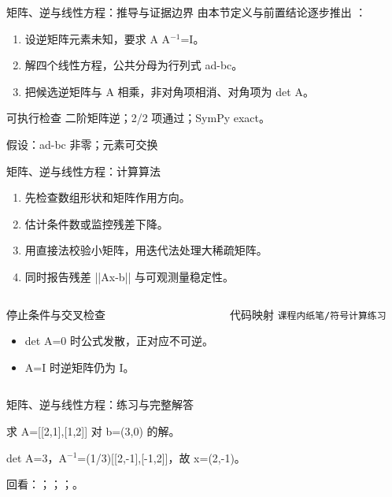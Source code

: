 \begin{frame}[t]{矩阵、逆与线性方程：推导与证据边界}
\footnotesize
{}\quad 由本节定义与前置结论逐步推出 ：
\begin{enumerate}
\item 设逆矩阵元素未知，要求 A A\ensuremath{^{-1}}=I。
\item 解四个线性方程，公共分母为行列式 ad-bc。
\item 把候选逆矩阵与 A 相乘，非对角项相消、对角项为 det A。
\end{enumerate}\begin{block}{可执行检查}
\quad 二阶矩阵逆；2/2 项通过；SymPy exact。
\par\scriptsize 假设：ad-bc 非零；元素可交换
\end{block}
\end{frame}

\begin{frame}[t]{矩阵、逆与线性方程：计算算法}
\footnotesize
{}\begin{enumerate}
\item 先检查数组形状和矩阵作用方向。
\item 估计条件数或监控残差下降。
\item 用直接法校验小矩阵，用迭代法处理大稀疏矩阵。
\item 同时报告残差 ||Ax-b|| 与可观测量稳定性。
\end{enumerate}\begin{columns}[T,onlytextwidth]
\begin{block}{停止条件与交叉检查}\scriptsize\begin{itemize}
\item[\CheckMark] det A=0 时公式发散，正对应不可逆。
\item[\CheckMark] A=I 时逆矩阵仍为 I。
\end{itemize}\end{block}
\begin{block}{代码映射}
\scriptsize \texttt{课程内纸笔/\allowbreak{}符号计算练习}
\end{block}\end{columns}\end{frame}

\begin{frame}[t]{矩阵、逆与线性方程：练习与完整解答}
\footnotesize
\begin{block}{}求 A=[[2,1],[1,2]] 对 b=(3,0) 的解。\end{block}
\begin{exampleblock}{}det A=3，A\ensuremath{^{-1}}=(1/\allowbreak{}3)[[2,-1],[-1,2]]，故 x=(2,-1)。\end{exampleblock}
\vfill
\scriptsize 回看：；；；。
\end{frame}

